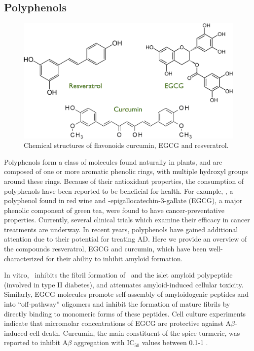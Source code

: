 \subsection{Polyphenols}
\begin{figure}
\centering
\includegraphics[width=5.5in]{figures/introduction/polyphenols.pdf}
\caption[Polyphenol molecules]{Chemical structures of flavonoids curcumin, EGCG and resveratrol.}
\label{fig:polyphenols}
\end{figure}

Polyphenols form a class of molecules found naturally in plants, and are composed of one or more aromatic phenolic rings, with multiple hydroxyl groups around these rings.  Because of their antioxidant properties, the consumption of polyphenols have been reported to be beneficial for health.  For example, \resve, a polyphenol found in red wine and  -epigallocatechin-3-gallate (EGCG), a major phenolic component of green tea, were found to have cancer-preventative properties.\cite{Baur:2006bx,Singh:2011ec} Currently, several clinical trials which examine their efficacy in cancer treatments are underway.\cite{Baur:2006bx,Singh:2011ec} In recent years, polyphenols have gained additional attention due to their potential for treating AD.\cite{Porat:2006fn} Here we provide an overview of the compounds resveratrol, EGCG and curcumin, which have been well-characterized for their ability to inhibit amyloid formation.

In vitro, \resve\ inhibits the fibril formation of \abeta\ and the islet amyloid polypeptide (involved in type II diabetes), and attenuates amyloid-induced cellular toxicity.\cite{Ono:2008bl,Feng:2009p2240} Similarly, EGCG molecules promote self-assembly of amyloidogenic peptides \abeta\cite{Ehrnhoefer:2008fd} and \alphas\cite{Bieschke:2010ju} into ``off-pathway'' oligomers and inhibit the formation of mature fibrils by directly binding to monomeric forms of these peptides. Cell culture experiments indicate that micromolar concentrations of EGCG are protective against A$\beta$-induced cell death.\cite{Levites:2003wm,Bastianetto:2006du} Curcumin, the main constituent of the spice turmeric, was reported to inhibit A$\beta$ aggregation with IC$_{50}$ values between 0.1-1 \micromolar.\cite{Singh:2012df,Ono:2004td,Hamaguchi:2009p2874,Kim:2005wk} 


